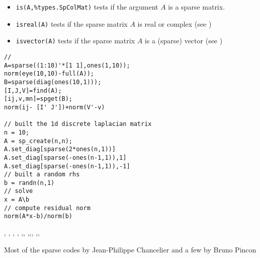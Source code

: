 \begin{itemize}
    \item \verb+is(A,%types.SpColMat)+ tests if the argument $A$ is a sparse matrix.
    \item \verb+isreal(A)+ tests if the sparse matrix $A$ is real or complex (see )
    \item \verb+isvector(A)+ tests if the sparse matrix $A$ is a (sparse) vector (see )
\end{itemize}


\begin{examples}
\begin{Verbatim}
//
A=sparse((1:10)'*[1 1],ones(1,10));
norm(eye(10,10)-full(A));
B=sparse(diag(ones(10,1)));
[I,J,V]=find(A);
[ij,v,mn]=spget(B);
norm(ij- [I' J'])+norm(V'-v)

// built the 1d discrete laplacian matrix
n = 10;
A = sp_create(n,n);
A.set_diag[sparse(2*ones(n,1))]
A.set_diag[sparse(-ones(n-1,1)),1]
A.set_diag[sparse(-ones(n-1,1)),-1]
// built a random rhs
b = randn(n,1)
// solve
x = A\b
// compute residual norm
norm(A*x-b)/norm(b)
\end{Verbatim}
\end{examples}

\begin{manseealso}
,
,
,
,
,,
,,,
,,
\end{manseealso}

\begin{authors}
   Most of the sparse codes by Jean-Philippe Chancelier and a few by Bruno Pincon
\end{authors}
